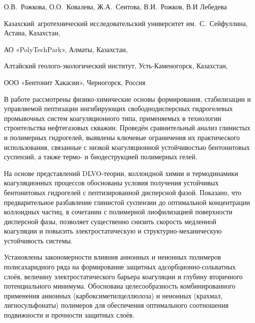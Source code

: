 
\begin{header}

О.В.~Рожкова\envelope,
О.О.~Ковалева,
Ж.А.~Сеитова,
В.И.~Рожков,
В.И Лебедева
\end{header}

\begin{affil}
Казахский~агротехнический исследовательский университет им.~С.~Сейфуллина, Астана, Казахстан,

АО «PolyTechPark», Алматы, Казахстан,

Алтайский геолого-экологический институт, Усть-Каменогорск, Казахстан,

ООО «Бентонит Хакасии», Черногорск, Россия

\end{affil}

В работе рассмотрены физико-химические основы формирования, стабилизации
и управляемой пептизации ингибирующих свободнодисперсных гидрогелевых
промывочных систем коагуляционного типа, применяемых в технологии
строительства нефтегазовых скважин. Проведён сравнительный анализ
глинистых и полимерных гидрогелей, выявлены ключевые ограничения их
практического использования, связанные с низкой коагуляционной
устойчивостью бентонитовых суспензий, а также термо- и биодеструкцией
полимерных гелей.

На основе представлений DLVO-теории, коллоидной химии и термодинамики
коагуляционных процессов обоснованы условия получения устойчивых
бентонитовых гидрогелей с пептизированной дисперсной фазой. Показано,
что предварительное разбавление глинистой суспензии до оптимальной
концентрации коллоидных частиц, в сочетании с полимерной лиофилизацией
поверхности дисперсной фазы, позволяет существенно снизить скорость
медленной коагуляции и повысить электростатическую и
структурно-механическую устойчивость системы.

Установлены закономерности влияния анионных и неионных полимеров
полисахаридного ряда на формирование защитных адсорбционно-сольватных
слоёв, величину электростатического барьера коагуляции и глубину
вторичного потенциального минимума. Обоснована целесообразность
комбинированного применения анионных (карбоксиметилцеллюлоза) и неионных
(крахмал, лигносульфонаты) полимеров для обеспечения оптимального
соотношения подвижности и прочности защитных слоёв.


